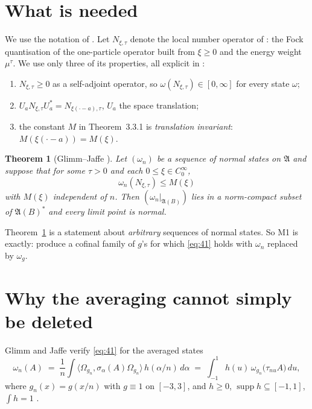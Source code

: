 \documentclass[11pt,a4paper]{article}
\theoremstyle{plain}
\newtheorem{theorem}{Theorem}[section]
\theoremstyle{definition}
\newcommand{\A}{\mathfrak{A}}
\newcommand{\Om}{\Omega}
\newcommand{\ip}[2]{\langle #1,#2\rangle}
\DeclareMathOperator{\supp}{supp}
\begin{document}
\section{What is needed}

We use the notation of \cite{M0}. Let $N_{\xi,\tau}$ denote the local number operator of
\cite[\S3.2]{GJIII}: the Fock quantisation of the one-particle operator built from
$\xi\ge0$ and the energy weight $\mu^\tau$. We use only three of its properties, all explicit in
\cite[\S3.2--3.3]{GJIII}:
\begin{enumerate}
\item[\textbf{(N1)}] $N_{\xi,\tau}\ge0$ as a self-adjoint operator, so $\omega(N_{\xi,\tau})\in[0,\infty]$
      for every state $\omega$;
\item[\textbf{(N2)}] $U_aN_{\xi,\tau}U_a^*=N_{\xi(\cdot-a),\tau}$, $U_a$ the space translation;
\item[\textbf{(N3)}] the constant $M$ in Theorem~3.3.1 is \emph{translation invariant}:
      $M(\xi(\cdot-a))=M(\xi)$.
\end{enumerate}

\begin{theorem}[Glimm--Jaffe {\cite[Thm.~4.1]{GJIII}}]\label{thm:GJ41}
Let $(\omega_n)$ be a sequence of normal states on $\A$ and suppose that for some $\tau>0$ and
each $0\le\xi\in C_0^\infty$,
\begin{equation}\label{eq:41}
  \omega_n(N_{\xi,\tau})\le M(\xi)
\end{equation}
with $M(\xi)$ independent of $n$. Then $(\omega_n|_{\A(B)})$ lies in a norm-compact subset of
$\A(B)^*$ and every limit point is normal.
\end{theorem}

Theorem~\ref{thm:GJ41} is a statement about \emph{arbitrary} sequences of normal states. So M1
is exactly: produce a cofinal family of $g$'s for which \eqref{eq:41} holds with $\omega_n$
replaced by $\omega_{g}$.

\section{Why the averaging cannot simply be deleted}\label{sec:diag}

Glimm and Jaffe verify \eqref{eq:41} for the averaged states
\begin{equation}\label{eq:avg}
  \omega_n(A)\;=\;\frac1n\int \ip{\Om_{g_n}}{\sigma_\alpha(A)\Om_{g_n}}\,h(\alpha/n)\,d\alpha
  \;=\;\int_{-1}^{1} h(u)\,\omega_{g_n}\bigl(\tau_{nu}A\bigr)\,du ,
\end{equation}
where $g_n(x)=g(x/n)$ with $g\equiv1$ on $[-3,3]$, and $h\ge0$, $\supp h\subseteq[-1,1]$,
$\int h=1$ \cite[(2.3)--(2.5)]{GJIII}.
\end{document}
